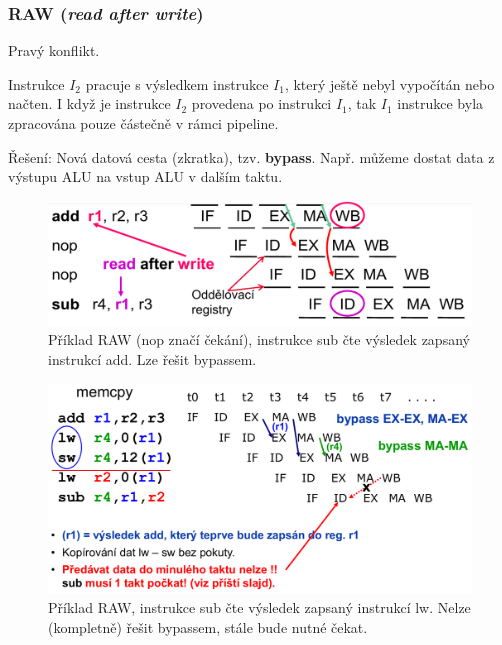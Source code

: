 \subsubsection{RAW (\textit{read after write})}
\begin{compactitem}
    \item Pravý konflikt.

    \item Instrukce $I_2$ pracuje s výsledkem instrukce $I_1$, který ještě nebyl vypočítán nebo načten. I když je instrukce $I_2$ provedena po instrukci $I_1$, tak $I_1$ instrukce byla zpracována pouze částečně v rámci pipeline.

    \item Řešení: Nová datová cesta (zkratka), tzv. \textbf{bypass}. Např. můžeme dostat data z výstupu ALU na vstup ALU v dalším taktu.

    \begin{figure}[H]
        \centering
        \includegraphics[width=0.8\linewidth]{raw_1.pdf}
        \caption{Příklad RAW (nop značí čekání), instrukce sub čte výsledek zapsaný instrukcí add. Lze řešit bypassem.}
    \end{figure}

    \begin{figure}[H]
        \centering
        \includegraphics[width=0.95\linewidth]{raw_2.pdf}
        \caption{Příklad RAW, instrukce sub čte výsledek zapsaný instrukcí lw. Nelze (kompletně) řešit bypassem, stále bude nutné čekat.}
    \end{figure}
\end{compactitem}

